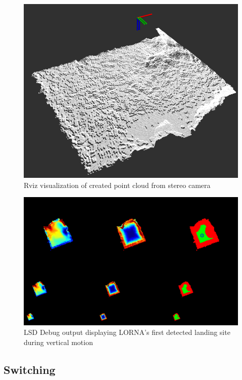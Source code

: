 \begin{figure}
    \centering
    \includegraphics[scale=0.45]{images/preparation/stereo/stereo_pointcloud.png}
    \caption{Rviz visualization of created point cloud from stereo camera}
\end{figure}
\clearpage %

\begin{figure}
    \centering
    \includegraphics[scale=0.25]{images/preparation/stereo/lsd_ascent.png}
    \caption{LSD Debug output displaying LORNA's first detected landing site during vertical motion}
\end{figure}

\subsection{Switching}

